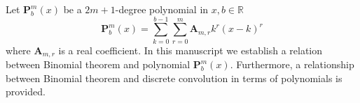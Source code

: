 Let $\mathbf{P}^{m}_{b}(x)$ be a $2m+1$-degree polynomial in $x,b\in\mathbb{R}$
\[
    \mathbf{P}^{m}_{b}(x) = \sum_{k=0}^{b-1} \sum_{r=0}^{m} \mathbf{A}_{m,r} k^r(x-k)^r
\]
where $\mathbf{A}_{m,r}$ is a real coefficient.
In this manuscript we establish a relation between Binomial theorem and polynomial $\mathbf{P}^{m}_{b}(x)$.
Furthermore, a relationship between Binomial theorem and discrete convolution in terms of polynomials is provided.
